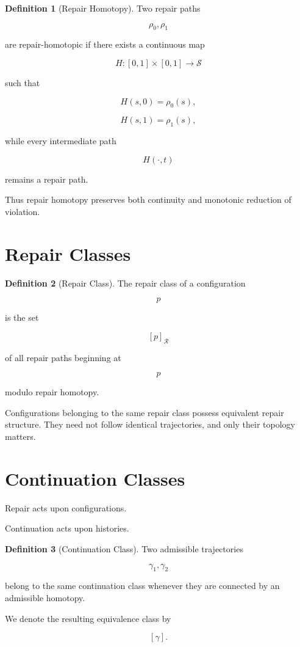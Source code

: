 \documentclass[11pt,oneside]{book}
\numberwithin{equation}{chapter}
\theoremstyle{definition}
\newtheorem{definition}{Definition}[chapter]
\theoremstyle{plain}
\newcommand{\State}{\mathcal{S}}
\newcommand{\Repair}{\mathcal{R}}
\begin{document}
\begin{definition}[Repair Homotopy]

Two repair paths

\[
\rho_0,
\rho_1
\]

are repair-homotopic if there exists a continuous map

\[
H:
[0,1]\times[0,1]
\rightarrow
\State
\]

such that

\[
H(s,0)=\rho_0(s),
\]

\[
H(s,1)=\rho_1(s),
\]

while every intermediate path

\[
H(\cdot,t)
\]

remains a repair path.

\end{definition}

Thus repair homotopy preserves both continuity and monotonic reduction of
violation.

\section{Repair Classes}

\begin{definition}[Repair Class]

The repair class of a configuration

\[
p
\]

is the set

\[
[p]_{\Repair}
\]

of all repair paths beginning at

\[
p
\]

modulo repair homotopy.

\end{definition}

Configurations belonging to the same repair class possess equivalent repair structure. They need not follow identical trajectories, and only their topology matters.

\section{Continuation Classes}

Repair acts upon configurations.

Continuation acts upon histories.

\begin{definition}[Continuation Class]

Two admissible trajectories

\[
\gamma_1,
\gamma_2
\]

belong to the same continuation class whenever they are connected by an
admissible homotopy.

We denote the resulting equivalence class by

\[
[\gamma].
\]

\end{definition}
\end{document}
